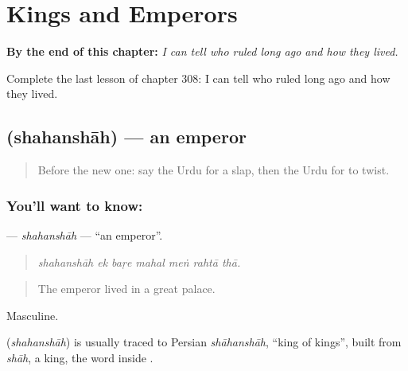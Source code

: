 
\chapter{Kings and Emperors}
\label{ch:ur-kings-and-emperors}

\begin{chapteropening}
\textbf{By the end of this chapter:} \emph{I can tell who ruled long ago and how they lived.}

Complete the last lesson of chapter 308: I can tell who ruled long ago and how they lived.
\end{chapteropening}

\section[\texorpdfstring{\ur{شہنشاہ} (shahanshāh)}{شہنشاہ (shahanshāh)}]{ (shahanshāh) — an emperor}

\label{lesson:UR-C308-shahanshah}



\begin{quote}
Before the new one: say the Urdu for a slap, then the Urdu for to twist.
\end{quote}

\subsection*{You'll want to know: }
\textbf{} — \emph{shahanshāh} — \textquotedblleft{}an emperor\textquotedblright{}.

\begin{quote}
      
\end{quote}

\begin{quote}
\emph{shahanshāh ek baṛe mahal meṅ rahtā thā.}
\end{quote}

\begin{quote}
The emperor lived in a great palace.
\end{quote}

Masculine.

\begin{cousinweb}
\textbf{} (\emph{shahanshāh}) is usually traced to Persian \emph{shāhanshāh}, \textquotedblleft{}king of kings\textquotedblright{}, built from \emph{shāh}, a king, the word inside \textbf{}.
\end{cousinweb}

